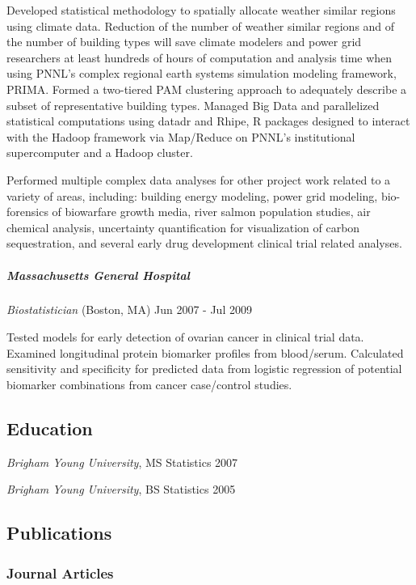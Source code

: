 \documentclass[11pt,]{article}
\let\oldsubparagraph\subparagraph
\renewcommand{\subparagraph}[1]{\oldsubparagraph{#1}\mbox{}}
\begin{document}
Developed statistical methodology to spatially allocate weather similar
regions using climate data. Reduction of the number of weather similar
regions and of the number of building types will save climate modelers
and power grid researchers at least hundreds of hours of computation and
analysis time when using PNNL's complex regional earth systems
simulation modeling framework, PRIMA. Formed a two-tiered PAM clustering
approach to adequately describe a subset of representative building
types. Managed Big Data and parallelized statistical computations using
datadr and Rhipe, R packages designed to interact with the Hadoop
framework via Map/Reduce on PNNL's institutional supercomputer and a
Hadoop cluster.

Performed multiple complex data analyses for other project work related
to a variety of areas, including: building energy modeling, power grid
modeling, bio-forensics of biowarfare growth media, river salmon
population studies, air chemical analysis, uncertainty quantification
for visualization of carbon sequestration, and several early drug
development clinical trial related analyses.

\subparagraph{Massachusetts General
Hospital}\label{massachusetts-general-hospital}

\emph{Biostatistician} (Boston, MA) \hfill Jun 2007 - Jul 2009

Tested models for early detection of ovarian cancer in clinical trial
data. Examined longitudinal protein biomarker profiles from blood/serum.
Calculated sensitivity and specificity for predicted data from logistic
regression of potential biomarker combinations from cancer case/control
studies.

\subsection{Education}\label{education}

\emph{Brigham Young University}, MS Statistics \hfill 2007

\emph{Brigham Young University}, BS Statistics \hfill 2005

\subsection{Publications}\label{publications}

\subsubsection{Journal Articles}\label{journal-articles}
\end{document}
